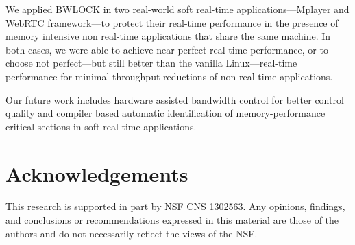 \documentclass[times, 10pt,onecolumn]{article}
\begin{document}
We applied BWLOCK in two real-world soft real-time
applications---Mplayer and WebRTC framework---to protect
their real-time performance in the presence of memory intensive non
real-time applications that share the same machine. In both cases, we
were able to achieve near perfect real-time performance, or to choose
not perfect---but still better than the vanilla Linux---real-time
performance for minimal throughput reductions of non-real-time
applications.

Our future work includes hardware assisted bandwidth control for
better control quality and compiler based automatic
identification of memory-performance critical sections in soft
real-time applications.

\section*{Acknowledgements} \label{acknowledge}
This research is supported in part by NSF CNS 1302563. Any opinions,
findings, and conclusions or recommendations expressed in this
material are those of the authors and do not necessarily reflect the
views of the NSF.




\end{document}
